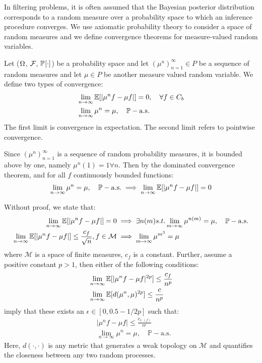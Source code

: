In filtering problems, it is often assumed that the Bayesian posterior distribution corresponds to a random measure over a probability space to which an inference procedure converges. We use axiomatic probability theory to consider a space of random measures  and we define convergence theorems for measure-valued random variables. 
\begin{lemma} 
	Let ($\Omega_{{}}$, $ \mathcal{F}_{{}}$, $\mathbb{P}_{{}}{[\cdot]}$) be a probability space and let $(\mu^n)_{n=1}^\infty \in P$ be a sequence of random measures and let $\mu \in P$ be another measure valued random variable. We define two types of convergence:
	\begin{align}
	&\lim_{n \to \infty} \mathbb{E}[ |\mu^nf - \mu f| ] = 0, \quad \forall f \in C_b \\
	&\lim_{n \to \infty} \mu^n = \mu, \quad \mathbb{P}-\mathrm{a.s.} 
	\end{align}The first limit is convergence in expectation.  The second limit refers to pointwise convergence. 
	
	Since  $(\mu^n)_{n=1}^\infty$ is a sequence of random probability measures, it is bounded above by one, namely  $\mu^n(1) = 1 \forall n$. Then by the {\color{red} dominated convergence theorem}, and for all $f$ continuously bounded functions:
	\begin{align}
	\lim_{n \to \infty} \mu^n = \mu, \quad \mathbb{P}-\mathrm{a.s.} \implies \lim_{n \to \infty} \mathbb{E}[ |\mu^nf - \mu f| ] = 0 
	\end{align}
		
	Without proof, we state that:
	\begin{align}
	\lim_{n \to \infty} \mathbb{E}[ |\mu^nf - \mu f| ] = 0  &\implies \exists n(m) s.t. \lim_{m \to \infty} \mu^{n(m)} = \mu, \quad \mathbb{P}-\mathrm{a.s.}  \\
	\lim_{n \to \infty} \mathbb{E}[ |\mu^nf - \mu f| ] \leq \frac{c_f}{\sqrt{n}}, f \in \mathcal{M} &\implies  \lim_{m \to \infty} \mu^{m^3} = \mu \\
	\end{align} where $\mathcal{M} $ is a space of finite measures, $c_f$ is a constant.
	Further, assume a positive constant $p>1$, then either of the following conditions:
	\begin{align}
	&\lim_{n \to \infty} \mathbb{E}[ |\mu^nf - \mu f|^{2p} ]  \leq \frac{c_f}{n^p} \\
	&\lim_{n \to \infty} \mathbb{E}[ d(\mu^n, \mu)^{2p} ]  \leq \frac{c}{n^p} 
	\end{align}
	imply that these exists an $\epsilon \in [0, 0.5 - 1/2p]$ such that:
	\begin{align}
	&|\mu^nf - \mu f| \leq \frac{c_{\epsilon, (f)}}{ n^\epsilon} \\
	&\lim_{n \to \infty} \mu^n = \mu, \quad \mathbb{P}-\mathrm{a.s.} 
	\end{align} Here, $d(\cdot, \cdot)$ is any metric that generates a {\color{red} weak topology} on $\mathcal{M} $ and quantifies the closeness between any two random processes.
\end{lemma}
	
